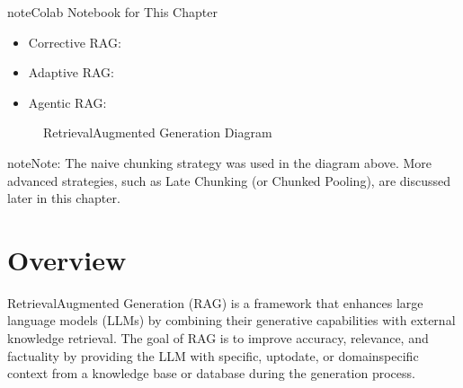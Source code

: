 \documentclass[letterpaper,11pt,english]{sphinxmanual}
\begin{document}
\begin{sphinxadmonition}{note}{Colab Notebook for This Chapter}
\begin{itemize}
\item {} 
\sphinxAtStartPar
Corrective RAG: 

\item {} 
\sphinxAtStartPar
Adaptive RAG: 

\item {} 
\sphinxAtStartPar
Agentic RAG: 

\end{itemize}
\end{sphinxadmonition}

\begin{figure}[htbp]
\centering
\capstart

\noindent{}
\caption{Retrieval\sphinxhyphen{}Augmented Generation Diagram}\label{\detokenize{rag:id38}}\label{\detokenize{rag:fig-rag}}\end{figure}

\begin{sphinxadmonition}{note}{Note:}
\sphinxAtStartPar
The naive chunking strategy was used in the diagram above. More advanced strategies,
such as Late Chunking  (or Chunked Pooling), are discussed later in this chapter.
\end{sphinxadmonition}


\section{Overview}
\label{\detokenize{rag:overview}}
\sphinxAtStartPar
Retrieval\sphinxhyphen{}Augmented Generation (RAG) is a framework that enhances large language models (LLMs)
by combining their generative capabilities with external knowledge retrieval. The goal of RAG
is to improve accuracy, relevance, and factuality by providing the LLM with specific, up\sphinxhyphen{}to\sphinxhyphen{}date,
or domain\sphinxhyphen{}specific context from a knowledge base or database during the generation process.
\end{document}
